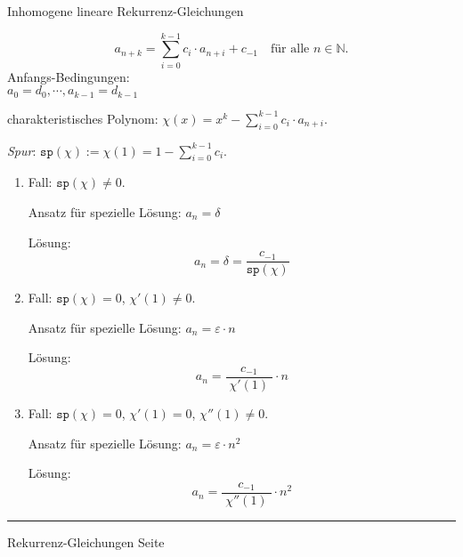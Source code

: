 \documentclass{slides}
\newcommand{\N}{{\mathbb N}}
\newcounter{mypage}
\newcommand{\bruch}[2]{\frac{\displaystyle#1}{\displaystyle#2}}
\begin{document}
\begin{slide}{}
 \begin{center}
  Inhomogene lineare Rekurrenz-Gleichungen 
\end{center}
\vspace*{-0.3cm}
\footnotesize
\[a_{n+k} = \sum\limits_{i=0}^{k-1} c_i \cdot a_{n+i} + c_{-1}\quad
     \mbox{f\"ur alle $n \in \N$}.\] 
Anfangs-Bedingungen:
\\[0.3cm]
\hspace*{1.3cm}      
$a_0 = d_0, \cdots, a_{k-1} = d_{k-1}$ 

charakteristisches Polynom: \quad $\chi(x) = x^k - \sum\limits_{i=0}^{k-1} c_{i} \cdot a_{n+i}$.

\emph{Spur}:  \quad $\mathtt{sp}(\chi) := \chi(1) = 1 - \sum\limits_{i=0}^{k-1} c_{i}$. 
\begin{enumerate}
\item Fall: $\mathtt{sp}(\chi) \not= 0$.

      Ansatz f\"ur spezielle L\"osung: \quad $a_n = \delta$

      L\"osung:
      \vspace*{-0.5cm}
      \[ a_n = \delta = \bruch{c_{-1}}{\mathtt{sp}(\chi)} \]
\item Fall: $\mathtt{sp}(\chi) = 0$, $\chi'(1) \not= 0$.

      Ansatz f\"ur spezielle L\"osung: \quad $a_n = \varepsilon \cdot n$

      L\"osung:  
      \vspace*{-0.5cm}
      \[a_n = \bruch{c_{-1}}{\;\chi'(1)\;}\cdot n\]
      \vspace*{-0.5cm}
\item Fall: $\mathtt{sp}(\chi) = 0$, $\chi'(1) = 0$,  $\chi''(1) \not= 0$.

      Ansatz f\"ur spezielle L\"osung: \quad $a_n = \varepsilon \cdot n^2$

      L\"osung:  
      \vspace*{-0.5cm}
      \[a_n = \bruch{c_{-1}}{\;\chi''(1)\;}\cdot n^2\]
      \vspace*{-0.5cm}
\end{enumerate}


\vspace*{\fill}
\tiny \addtocounter{mypage}{1}
\rule{17cm}{1mm}
Rekurrenz-Gleichungen  \hspace*{\fill} Seite 
\end{slide}

\end{document}
